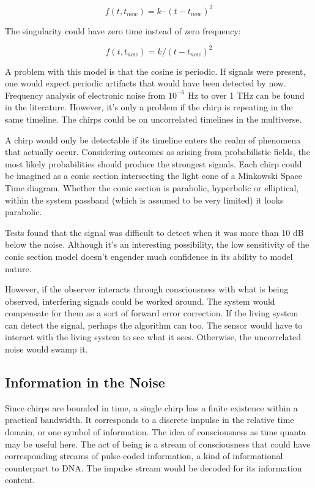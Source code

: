 \begin{equation} \label{eq:parabolic}
f(t, t_{now}) = k \cdot (t - t_{now})^2
\end{equation}

The singularity could have zero time instead of zero frequency:

\begin{equation} \label{eq:parabolictime}
f(t, t_{now}) = k / (t - t_{now})^2
\end{equation}

A problem with this model is that the cosine is periodic.
If signals were present, one would expect periodic artifacts that would have
been detected by now. Frequency analysis of electronic noise
from $10^{-6}$ Hz to over 1 THz can be found in the literature.
However, it's only a problem if the chirp is repeating in the same timeline.
The chirps could be on uncorrelated timelines in the multiverse.

A chirp would only be detectable if its timeline enters the realm of phenomena
that actually occur.
Considering outcomes as arising from probabilistic fields,
the most likely probabilities should produce the strongest signals.
Each chirp could be imagined as a conic section intersecting the light cone of
a Minkowski Space Time diagram. 
Whether the conic section is parabolic, hyperbolic or elliptical, within the 
system passband (which is assumed to be very limited) it looks parabolic.

Tests found that the signal was difficult to detect when it was more than 
10 dB below the noise.
Although it's an interesting possibility,
the low sensitivity of the conic section model doesn't engender much confidence
in its ability to model nature.

However, if the observer interacts through consciousness with what is being
observed, interfering signals could be worked around.
The system would compensate for them as a sort of forward error correction.
If the living system can detect the signal, perhaps the algorithm can too.
The sensor would have to interact with the living system to see what it sees.
Otherwise, the uncorrelated noise would swamp it.

\subsection{Information in the Noise}

Since chirps are bounded in time, a single chirp has a finite
existence within a practical bandwidth. 
It corresponds to a discrete impulse in the relative time domain,
or one symbol of information.
The idea of consciousness as time quanta may be useful here.
The act of being is a stream of consciousness that could have corresponding
streams of pulse-coded information, a kind of informational counterpart to DNA.
The impulse stream would be decoded for its information content.

